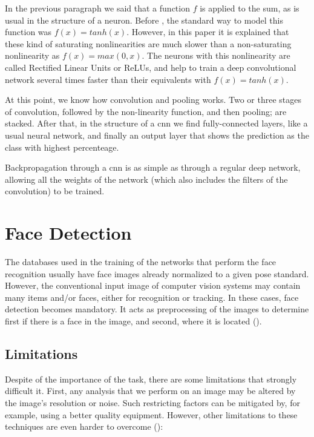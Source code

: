 In the previous paragraph we said that a function $f$ is applied to the sum, as is usual in the structure of a neuron. Before \cite{krizhevsky2012deep}, the standard way to model this function was $f(x)=tanh(x)$. However, in this paper it is explained that these kind of saturating nonlinearities are much slower than a non-saturating nonlinearity as $f(x)=max(0, x)$. The neurons with this nonlinearity are called Rectified Linear Units or ReLUs, and help to train a deep convolutional network several times faster than their equivalents with $f(x)=tanh(x)$.

At this point, we know how convolution and pooling works. Two or three stages of convolution, followed by the non-linearity function, and then pooling; are stacked. After that, in the structure of a \gls{cnn} we find fully-connected layers, like a usual neural network, and finally an output layer that shows the prediction as the class with highest percenteage.

Backpropagation through a \gls{cnn} is as simple as through a regular deep network, allowing all the weights of the network (which also includes the filters of the convolution) to be trained.

\section{Face Detection}
The databases used in the training of the networks that perform the face recognition usually have face images already normalized  to  a  given  pose  standard. However,  the  conventional  input  image  of  computer  vision  systems  may  contain many items and/or faces, either for recognition or tracking. In these cases, face detection becomes mandatory. It acts as preprocessing of the images to determine first
if there is a face in the image, and second, where it is located (\cite{marques2010face}).

	\subsection{Limitations}
	Despite of the importance of the task, there are some limitations that strongly difficult it. First, any analysis that we perform on an image may be altered by the image’s resolution or noise. Such restricting factors can be mitigated by, for example, using a better quality equipment. However, other limitations to these techniques are even harder to overcome (\cite{yang2002detecting}):


